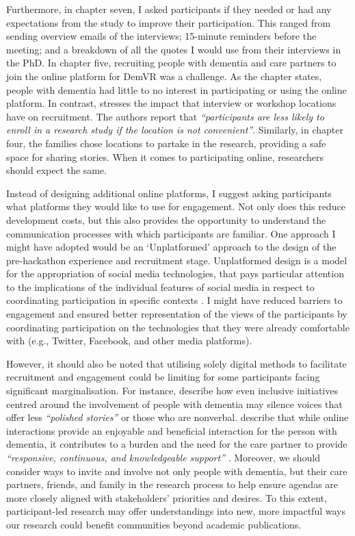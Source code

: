 Furthermore, in chapter seven, I asked participants if they needed or had any expectations from the study to improve their participation. This ranged from sending overview emails of the interviews; 15-minute reminders before the meeting; and a breakdown of all the quotes I would use from their interviews in the PhD. In chapter five, recruiting people with dementia and care partners to join the online platform for DemVR was a challenge. As the chapter states, people with dementia had little to no interest in participating or using the online platform. In contrast, \cite{namageyo2014recruitment} stresses the impact that interview or workshop locations have on recruitment. The authors report that \textit{``participants are less likely to enroll in a research study if the location is not convenient''}. Similarly, in chapter four, the families chose locations to partake in the research, providing a safe space for sharing stories. When it comes to participating online, researchers should expect the same.  

Instead of designing additional online platforms, I suggest asking participants what platforms they would like to use for engagement. Not only does this reduce development costs, but this also provides the opportunity to understand the communication processes with which participants are familiar. One approach I might have adopted would be an ‘Unplatformed’ approach to the design of the pre-hackathon experience and recruitment stage. Unplatformed design is a model for the appropriation of social media technologies, that pays particular attention to the implications of the individual features of social media in respect to coordinating participation in specific contexts \citep{lambton-howard_unplatformed_2020}. I might have reduced barriers to engagement and ensured better representation of the views of the participants by coordinating participation on the technologies that they were already comfortable with (e.g., Twitter, Facebook, and other media platforms). 

However, it should also be noted that utilising solely digital methods to facilitate recruitment and engagement could be limiting for some participants facing significant marginalisation. For instance, \cite{lazar_safe_2019} describe how even inclusive initiatives centred around the involvement of people with dementia may silence voices that offer less \textit{``polished stories''} or those who are nonverbal. \cite{dai2020making} describe that while online interactions provide an enjoyable and beneficial interaction for the person with dementia, it contributes to a burden and the need for the care partner to provide \textit{``responsive, continuous, and knowledgeable support'' }\citep[pg. 46:24]{hwang2020exploring}. Moreover, we should consider ways to invite and involve not only people with dementia, but their care partners, friends, and family in the research process to help ensure agendas are more closely aligned with stakeholders’ priorities and desires. To this extent, participant-led research may offer understandings into new, more impactful ways our research could benefit communities beyond academic publications.

